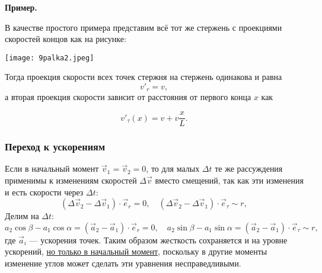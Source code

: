 \documentclass[12pt, a4paper]{article}%
\begin{document}
\textbf{Пример.}

В качестве простого примера представим всё тот же стержень с проекциями скоростей 
концов как на рисунке:

\begin{center}
\texttt{[image: 9palka2.jpeg]}
\label{fig:mpr}
\end{center}

Тогда проекция скорости всех точек стержня на стержень одинакова и равна \[ v'_r = v,\] а вторая проекция скорости зависит от расстояния от первого конца $x$ как 

\[
v'_\tau (x) = v+v\frac{x}{L}.
\]

\subsubsection*{Переход к ускорениям}
Если в начальный момент $\vec v_1=\vec v_2=0$, то для малых $\Delta t$ те же 
рассуждения применимы к изменениям скоростей $\Delta\vec v$ вместо смещений, так
как эти изменения и есть скорости через $\Delta t$:
\[
(\Delta\vec v_2 - \Delta\vec v_1)\cdot\vec e_r = 0,
\quad
(\Delta\vec v_2 - \Delta\vec v_1)\cdot\vec e_\tau \sim r,
\]
Делим на $\Delta t$:
\[
a_2\cos\beta - a_1\cos\alpha = (\vec a_2 - \vec a_1)\cdot\vec e_r = 0,
\quad
a_2\sin\beta - a_1\sin\alpha = (\vec a_2 - \vec a_1)\cdot\vec e_\tau \sim r,
\]
где $\vec a_i$ — ускорения точек. Таким образом жесткость сохраняется и на уровне ускорений, \underline{но только в начальный момент}, поскольку в другие моменты изменение углов может сделать эти уравнения несправедливыми.
\end{document}
